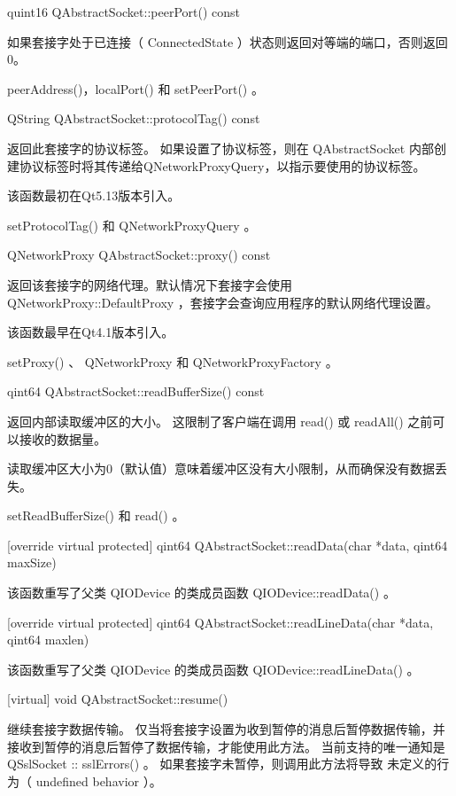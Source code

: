 quint16 QAbstractSocket::peerPort() const


如果套接字处于已连接（ ConnectedState ）状态则返回对等端的端口，否则返回0。

\begin{notice}[另请查阅]
peerAddress()，localPort() 和 setPeerPort() 。
\end{notice}


QString QAbstractSocket::protocolTag() const

返回此套接字的协议标签。 如果设置了协议标签，则在 QAbstractSocket 内部创建协议标签时将其传递给QNetworkProxyQuery，以指示要使用的协议标签。

该函数最初在Qt5.13版本引入。

\begin{notice}[另请查阅]
setProtocolTag() 和 QNetworkProxyQuery  。
\end{notice}

QNetworkProxy QAbstractSocket::proxy() const

返回该套接字的网络代理。默认情况下套接字会使用 QNetworkProxy::DefaultProxy ，套接字会查询应用程序的默认网络代理设置。

该函数最早在Qt4.1版本引入。

\begin{notice}[另请查阅]
setProxy() 、 QNetworkProxy 和 QNetworkProxyFactory 。
\end{notice}

qint64 QAbstractSocket::readBufferSize() const

返回内部读取缓冲区的大小。 这限制了客户端在调用 read() 或 readAll() 之前可以接收的数据量。

读取缓冲区大小为0（默认值）意味着缓冲区没有大小限制，从而确保没有数据丢失。

\begin{notice}[另请查阅]
setReadBufferSize() 和 read()  。
\end{notice}

[override virtual protected] qint64 QAbstractSocket::readData(char
*data, qint64 maxSize)

该函数重写了父类 QIODevice 的类成员函数 QIODevice::readData() 。

[override virtual protected] qint64 QAbstractSocket::readLineData(char
*data, qint64 maxlen)

该函数重写了父类 QIODevice 的类成员函数 QIODevice::readLineData() 。

[virtual] void QAbstractSocket::resume()

继续套接字数据传输。 仅当将套接字设置为收到暂停的消息后暂停数据传输，并接收到暂停的消息后暂停了数据传输，才能使用此方法。 当前支持的唯一通知是 QSslSocket :: sslErrors() 。 如果套接字未暂停，则调用此方法将导致 未定义的行为（ undefined behavior ）。

